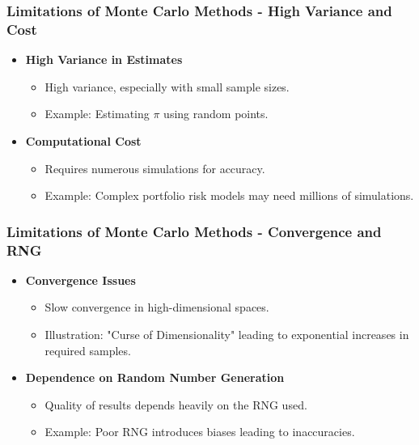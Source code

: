 \documentclass[aspectratio=169]{beamer}
\begin{document}
\begin{frame}[fragile]
  \frametitle{Limitations of Monte Carlo Methods - High Variance and Cost}
  \begin{itemize}
    \item \textbf{High Variance in Estimates}
      \begin{itemize}
        \item High variance, especially with small sample sizes.
        \item Example: Estimating $\pi$ using random points.
      \end{itemize}
      
    \item \textbf{Computational Cost}
      \begin{itemize}
        \item Requires numerous simulations for accuracy.
        \item Example: Complex portfolio risk models may need millions of simulations.
      \end{itemize}
  \end{itemize}
\end{frame}

\begin{frame}[fragile]
  \frametitle{Limitations of Monte Carlo Methods - Convergence and RNG}
  \begin{itemize}
    \item \textbf{Convergence Issues}
      \begin{itemize}
        \item Slow convergence in high-dimensional spaces.
        \item Illustration: "Curse of Dimensionality" leading to exponential increases in required samples.
      \end{itemize}

    \item \textbf{Dependence on Random Number Generation}
      \begin{itemize}
        \item Quality of results depends heavily on the RNG used.
        \item Example: Poor RNG introduces biases leading to inaccuracies.
      \end{itemize}
  \end{itemize}
\end{frame}
\end{document}
